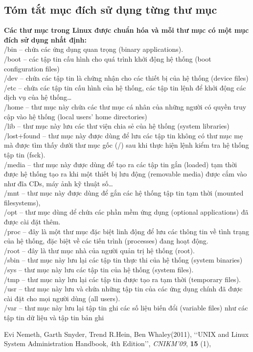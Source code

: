 \documentclass[twoside]{article}
\begin{document}
\subsection{Tóm tắt mục đích sử dụng từng thư mục}
\textbf{Các thư mục trong Linux được chuẩn hóa và mỗi thư mục có một mục đích sử dụng nhất định:} \\
/bin – chứa các ứng dụng quan trọng (binary applications).\\
/boot – các tập tin cấu hình cho quá trình khởi động hệ thống (boot configuration files) \\
/dev – chứa các tập tin là chứng nhận cho các thiết bị của hệ thống (device files)\\
/etc – chứa các tập tin cấu hình của hệ thống, các tập tin lệnh để khởi động các dịch vụ của hệ thống…\\
/home – thư mục này chứa các thư mục cá nhân của những người có quyền truy cập vào hệ thống (local users’ home directories)\\
/lib – thư mục này lưu các thư viện chia sẻ của hệ thống (system libraries)\\
/lost+found – thư mục này được dùng để lưu các tập tin không có thư mục mẹ mà được tìm thấy dưới thư mục gốc (/) sau khi thực hiện lệnh kiểm tra hệ thống tập tin (fsck).\\
/media – thư mục này được dùng để tạo ra các tập tin gắn (loaded) tạm thời được hệ thống tạo ra khi một thiết bị lưu động (removable media) được cắm vào như đĩa CDs, máy ảnh kỹ thuật số…\\
/mnt – thư mục này được dùng để gắn các hệ thống tập tin tạm thời (mounted filesystems),\\
/opt – thư mục dùng dể chứa các phần mềm ứng dụng (optional applications) đã được cài đặt thêm.\\
/proc – đây là một thư mục đặc biệt linh động để lưu các thông tin về tình trạng của hệ thống, đặc biệt về các tiến trình (processes) đang hoạt động.\\
/root – đây là thư mục nhà của người quản trị hệ thống (root). \\
/sbin – thư mục này lưu lại các tập tin thực thi của hệ thống (system binaries)\\
/sys – thư mục này lưu các tập tin của hệ thống (system files).\\
/tmp – thư mục này lưu lại các tập tin được tạo ra tạm thời (temporary files).\\
/usr – thư mục này lưu và chứa những tập tin của các ứng dụng chính đã được cài đặt cho mọi người dùng (all users). \\
/var – thư mục này lưu lại tập tin ghi các số liệu biến đổi (variable files) như các tập tin dữ liệu và tập tin bản ghi \\
\begin{thebibliography}{xxx}
\bibitem{}
Evi Nemeth, Garth Snyder, Trend R.Hein, Ben Whaley(2011), ‘‘UNIX and Linux System Administration Handbook, 4th Edition’’, \emph{CNIKM'09}, \textbf{15}
(1),
\end{thebibliography}
\end{document}
